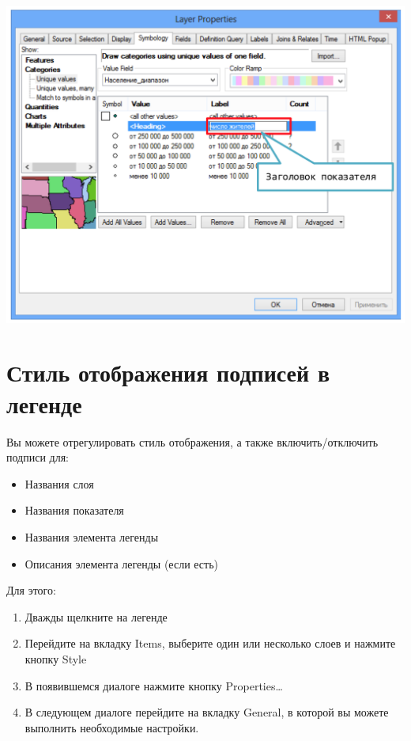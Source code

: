 \documentclass[12pt,]{book}
\begin{document}
\includegraphics{images/Appendix/image58.png}

\hypertarget{section-58}{%
\section{Стиль отображения подписей в легенде}\label{section-58}}

Вы можете отрегулировать стиль отображения, а также включить/отключить подписи для:

\begin{itemize}
\item
  Названия слоя
\item
  Названия показателя
\item
  Названия элемента легенды
\item
  Описания элемента легенды (если есть)
\end{itemize}

Для этого:

\begin{enumerate}
\def\labelenumi{\arabic{enumi}.}
\item
  Дважды щелкните на легенде
\item
  Перейдите на вкладку Items, выберите один или несколько слоев и нажмите кнопку Style
\item
  В появившемся диалоге нажмите кнопку Properties\ldots{}
\item
  В следующем диалоге перейдите на вкладку General, в которой вы можете выполнить необходимые настройки.
\end{enumerate}
\end{document}
